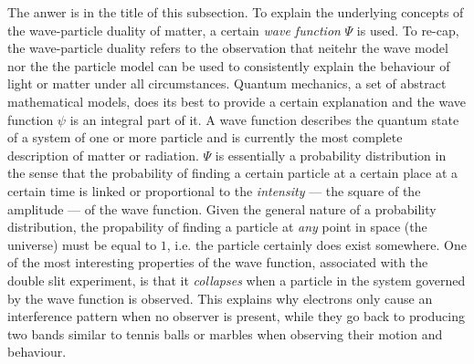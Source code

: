 
The anwer is in the title of this subsection. To explain the underlying concepts of the wave-particle duality of matter, a certain \emph{wave function} $\Psi$ is used. To re-cap, the wave-particle duality refers to the observation that neitehr the wave model nor the the particle model can be used to consistently explain the behaviour of light or matter under all circumstances. Quantum mechanics, a set of abstract mathematical models, does its best to provide a certain explanation and the wave function $\psi$ is an integral part of it. A wave function describes the quantum state of a system of one or more particle and is currently the most complete description of matter or radiation. $\Psi$ is essentially a probability distribution in the sense that the probability of finding a certain particle at a certain place at a certain time is linked or proportional to the \emph{intensity} --- the square of the amplitude --- of the wave function. Given the general nature of a probability distribution, the propability of finding a particle at \emph{any} point in space (the universe) must be equal to $1$, i.e. the particle certainly does exist somewhere. One of the most interesting properties of the wave function, associated with the double slit experiment, is that it \emph{collapses} when a particle in the system governed by the wave function is observed. This explains why electrons only cause an interference pattern when no observer is present, while they go back to producing two bands similar to tennis balls or marbles when observing their motion and behaviour.

\pagebreak



